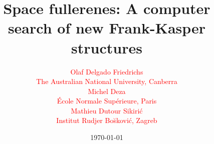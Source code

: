 \documentclass{beamer}
\begin{document}
\title{Space fullerenes: A computer search of new Frank-Kasper structures}
\author{
{\small
\begin{multicols}{2}
\textcolor{red}{\large Olaf Delgado Friedrichs}\\[2mm]
\textcolor{red}{The Australian National University, Canberra}\\[2mm]
\textcolor{red}{\large Michel Deza}\\[2mm]
\textcolor{red}{\'Ecole Normale Sup\'erieure, Paris}
\end{multicols}
\begin{center}
\textcolor{red}{\large Mathieu Dutour Sikiri\'c}\\[2mm]
\textcolor{red}{Institut Rudjer Bo\u skovi\'c, Zagreb}
\end{center}
}
}
\date{\today} 

\frame{\titlepage} 


\end{document}
